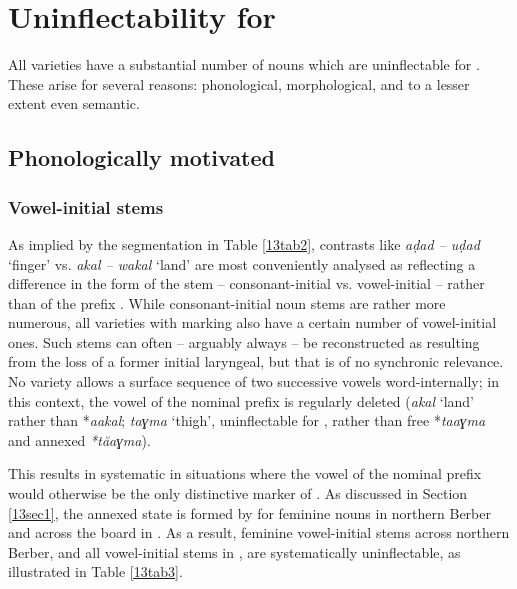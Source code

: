 \documentclass[output=paper,colorlinks,citecolor=brown]{langscibook}
\begin{document}
\section{Uninflectability for } \label{13sec2}

All  varieties have a substantial number of nouns which are uninflectable for . These arise for several reasons: phonological, morphological, and to a lesser extent even semantic.

\subsection{Phonologically motivated} \label{13sec2.1}

\subsubsection{Vowel-initial stems} \label{13sec2.1.1}

As implied by the segmentation in Table \ref{13tab2}, contrasts like \emph{aḍad -- uḍad} `finger' vs. \emph{akal -- wakal} `land' are most conveniently analysed as reflecting a difference in the form of the stem -- consonant-initial vs. vowel-initial -- rather than of the prefix \citep{prasse1964, penchoen1973}. While consonant-initial noun stems are rather more numerous, all  varieties with  marking also have a certain number of vowel-initial ones. Such stems can often -- arguably always \citep{prasse1969, prasse2011} -- be reconstructed as resulting from the loss of a former initial laryngeal, but that is of no synchronic relevance. No  variety allows a surface sequence of two successive vowels word-internally; in this context, the vowel of the nominal prefix is regularly deleted (\emph{akal} `land' rather than *\emph{aakal};  \emph{taɣma} `thigh', uninflectable for , rather than free *\emph{taaɣma} and annexed \emph{*tăaɣma}).

This results in systematic  in situations where the vowel of the nominal prefix would otherwise be the only distinctive marker of . As discussed in Section \ref{13sec1}, the annexed state is formed by  for feminine nouns in northern Berber and across the board in . As a result, feminine vowel-initial stems across northern Berber, and all vowel-initial stems in , are systematically uninflectable, as illustrated in Table \ref{13tab3}.
\end{document}

